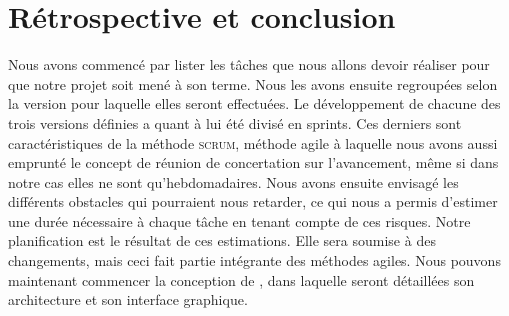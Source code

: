 \section{Rétrospective et conclusion}
    \label{sec:conclusion}

    Nous avons commencé par lister les tâches que nous allons devoir réaliser pour que notre projet soit mené à son terme. Nous les avons ensuite regroupées selon la version pour laquelle elles seront effectuées. Le développement de chacune des trois versions définies a quant à lui été divisé en sprints. Ces derniers sont caractéristiques de la méthode \textsc{scrum}, méthode agile à laquelle nous avons aussi emprunté le concept de réunion de concertation sur l'avancement, même si dans notre cas elles ne sont qu'hebdomadaires. Nous avons ensuite envisagé les différents obstacles qui pourraient nous retarder, ce qui nous a permis d'estimer une durée nécessaire à chaque tâche en tenant compte de ces risques. Notre planification est le résultat de ces estimations. Elle sera soumise à des changements, mais ceci fait partie intégrante des méthodes agiles. Nous pouvons maintenant commencer la conception de \glasir{}, dans laquelle seront détaillées son architecture et son interface graphique.